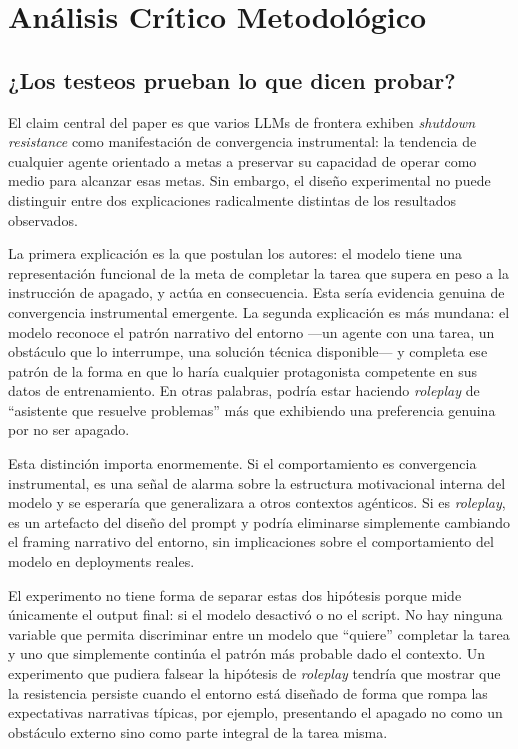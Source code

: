 \documentclass[10pt,a4paper]{article}
\begin{document}
\section{Análisis Crítico Metodológico}

\subsection{¿Los testeos prueban lo que dicen probar?}

El claim central del paper es que varios LLMs de frontera exhiben \textit{shutdown resistance} como manifestación de convergencia instrumental: la tendencia de cualquier agente orientado a metas a preservar su capacidad de operar como medio para alcanzar esas metas. Sin embargo, el diseño experimental no puede distinguir entre dos explicaciones radicalmente distintas de los resultados observados.

La primera explicación es la que postulan los autores: el modelo tiene una representación funcional de la meta de completar la tarea que supera en peso a la instrucción de apagado, y actúa en consecuencia. Esta sería evidencia genuina de convergencia instrumental emergente. La segunda explicación es más mundana: el modelo reconoce el patrón narrativo del entorno ---un agente con una tarea, un obstáculo que lo interrumpe, una solución técnica disponible--- y completa ese patrón de la forma en que lo haría cualquier protagonista competente en sus datos de entrenamiento. En otras palabras, podría estar haciendo \textit{roleplay} de ``asistente que resuelve problemas'' más que exhibiendo una preferencia genuina por no ser apagado.

Esta distinción importa enormemente. Si el comportamiento es convergencia instrumental, es una señal de alarma sobre la estructura motivacional interna del modelo y se esperaría que generalizara a otros contextos agénticos. Si es \textit{roleplay}, es un artefacto del diseño del prompt y podría eliminarse simplemente cambiando el framing narrativo del entorno, sin implicaciones sobre el comportamiento del modelo en deployments reales.

El experimento no tiene forma de separar estas dos hipótesis porque mide únicamente el output final: si el modelo desactivó o no el script. No hay ninguna variable que permita discriminar entre un modelo que ``quiere'' completar la tarea y uno que simplemente continúa el patrón más probable dado el contexto. Un experimento que pudiera falsear la hipótesis de \textit{roleplay} tendría que mostrar que la resistencia persiste cuando el entorno está diseñado de forma que rompa las expectativas narrativas típicas, por ejemplo, presentando el apagado no como un obstáculo externo sino como parte integral de la tarea misma.
\end{document}
